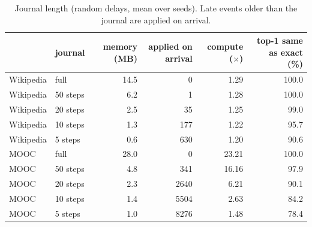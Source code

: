\begin{table}[!htb]
\centering\scriptsize
\caption{Journal length (random delays, mean over seeds). Late events older than the journal are applied on arrival.}
\label{tab:horizon}
\setlength{\tabcolsep}{4pt}
\begin{tabular}{@{}llrrrr@{}}
\toprule
 & journal & memory (MB) & applied on arrival & compute ($\times$) & top-1 same as exact (\%) \\
\midrule
Wikipedia & full & 14.5 & 0 & 1.29 & 100.0 \\
Wikipedia & 50 steps & 6.2 & 1 & 1.28 & 100.0 \\
Wikipedia & 20 steps & 2.5 & 35 & 1.25 & 99.0 \\
Wikipedia & 10 steps & 1.3 & 177 & 1.22 & 95.7 \\
Wikipedia & 5 steps & 0.6 & 630 & 1.20 & 90.6 \\
MOOC & full & 28.0 & 0 & 23.21 & 100.0 \\
MOOC & 50 steps & 4.8 & 341 & 16.16 & 97.9 \\
MOOC & 20 steps & 2.3 & 2640 & 6.21 & 90.1 \\
MOOC & 10 steps & 1.4 & 5504 & 2.63 & 84.2 \\
MOOC & 5 steps & 1.0 & 8276 & 1.48 & 78.4 \\
\bottomrule
\end{tabular}
\end{table}
